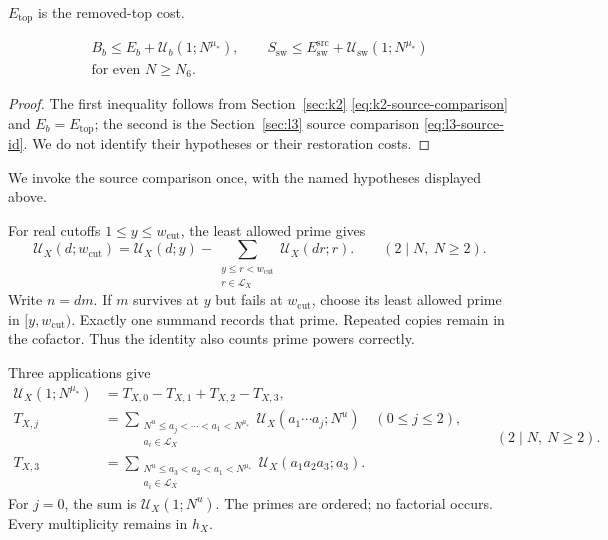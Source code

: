 \(E_{\mathrm{top}}\) is the removed-top cost.
\begin{lemma}
\label{lem:source-upper-sources}
\begin{equation}\label{eq:source-upper-comparison}
\begin{gathered}
 B_b\le E_b+\mathscr U_b(1;N^{\mu_*}),\qquad
 S_{\mathrm{sw}}\le E_{\mathrm{sw}}^{\mathrm{src}}+
 \mathscr U_{\mathrm{sw}}(1;N^{\mu_*})\\
 \text{for even }N\ge N_6.
\end{gathered}
\end{equation}
\begin{proof}
The first inequality follows from Section~\ref{sec:k2} \eqref{eq:k2-source-comparison}
and \(E_b=E_{\mathrm{top}}\); the second is the Section~\ref{sec:l3} source comparison
\eqref{eq:l3-source-id}.
We do not identify their hypotheses or their restoration costs.
\end{proof}
We invoke the source comparison once, with the named hypotheses displayed above.
\end{lemma}
For real cutoffs \(1\le y\le w_{\mathrm{cut}}\), the least allowed prime gives
\begin{equation}\label{eq:source-buchstab-one-step}
 \mathscr U_X(d;w_{\mathrm{cut}})=\mathscr U_X(d;y)
 -\sum_{\substack{y\le r<w_{\mathrm{cut}}\\r\in\mathscr L_X}}\mathscr U_X(dr;r).
\qquad(2\mid N,\ N\ge2).
\end{equation}
Write \(n=dm\).
If \(m\) survives at \(y\) but fails at \(w_{\mathrm{cut}}\),
choose its least allowed prime in \([y,w_{\mathrm{cut}})\).
Exactly one summand records that prime.
Repeated copies remain in the cofactor.
Thus the identity also counts prime powers correctly.

Three applications give
\begin{equation}\label{eq:source-buchstab}
\begin{aligned}
 \mathscr U_X(1;N^{\mu_*})&=T_{X,0}-T_{X,1}+T_{X,2}-T_{X,3},\\
 T_{X,j}&=\sum_{\substack{N^u\le a_j<\cdots<a_1<N^{\mu_*}\\
                         a_i\in\mathscr L_X}}
                         \mathscr U_X(a_1\cdots a_j;N^u)\quad(0\le j\le2),\\
 T_{X,3}&=\sum_{\substack{N^u\le a_3<a_2<a_1<N^{\mu_*}\\
                         a_i\in\mathscr L_X}}
                         \mathscr U_X(a_1a_2a_3;a_3).
\end{aligned}
\qquad(2\mid N,\ N\ge2).
\end{equation}
For \(j=0\), the sum is \(\mathscr U_X(1;N^u)\).
The primes are ordered; no factorial occurs.
Every multiplicity remains in \(h_X\).

